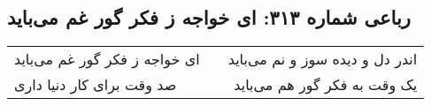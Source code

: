 \begin{center}
\section*{رباعی شماره ۳۱۳: ای خواجه ز فکر گور غم می‌باید}
\label{sec:sh313}
\begin{longtable}{l p{0.5cm} r}
ای خواجه ز فکر گور غم می‌باید
&&
اندر دل و دیده سوز و نم می‌باید
\\
صد وقت برای کار دنیا داری
&&
یک وقت به فکر گور هم می‌باید
\\
\end{longtable}
\end{center}
